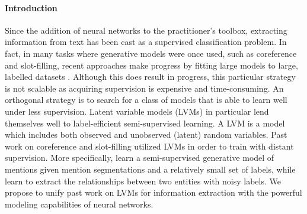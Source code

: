 \documentclass[11pt]{article}
\begin{document}
\paragraph{Introduction}
Since the addition of neural networks to the practitioner's toolbox,
extracting information from text has been cast as a supervised classification problem.
In fact, in many tasks where generative models were once used, such as coreference and slot-filling,
recent approaches make progress by fitting large models to large, labelled datasets \citep{lee2018coref,zhang2017slotfilling}.
Although this does result in progress, this particular strategy is not scalable as acquiring supervision is expensive
and time-consuming.
An orthogonal strategy is to search for a class of models that is able to learn well under less supervision.
Latent variable models (LVMs) in particular lend themselves well to label-efficient semi-supervised learning.
A LVM is a model which includes both observed and unobserved (latent) random variables.
Past work on coreference and slot-filling utilized LVMs in order to train with distant supervision.
More specifically, \citet{haghighi2010coref} learn a semi-supervised generative model of mentions given mention
segmentations and a relatively small set of labels,
while \citet{surdeanu2012miml} learn to extract the relationships between two entities with noisy labels.
We propose to unify past work on LVMs for information extraction with the powerful modeling capabilities
of neural networks.
\end{document}
